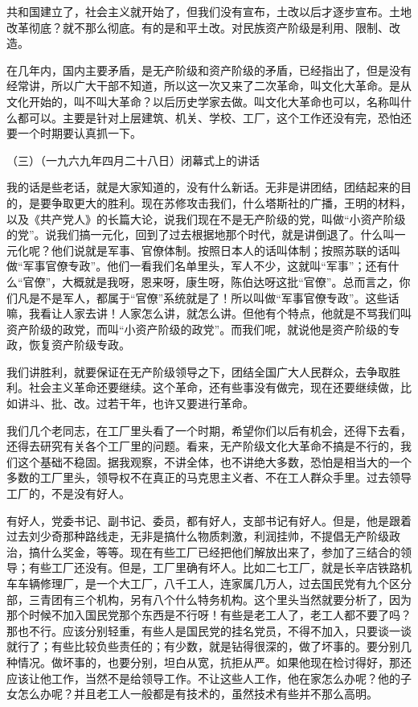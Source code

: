 共和国建立了，社会主义就开始了，但我们没有宣布，土改以后才逐步宣布。土地改革彻底？就不那么彻底。有的是和平土改。对民族资产阶级是利用、限制、改造。

在几年内，国内主要矛盾，是无产阶级和资产阶级的矛盾，已经指出了，但是没有经常讲，所以广大干部不知道，所以这一次又来了二次革命，叫文化大革命。是从文化开始的，叫不叫大革命？以后历史学家去做。叫文化大革命也可以，名称叫什么都可以。主要是针对上层建筑、机关、学校、工厂，这个工作还没有完，恐怕还要一个时期要认真抓一下。

（三）（一九六九年四月二十八日）闭幕式上的讲话

我的话是些老话，就是大家知道的，没有什么新话。无非是讲团结，团结起来的目的，是要争取更大的胜利。现在苏修攻击我们，什么塔斯社的广播，王明的材料，以及《共产党人》的长篇大论，说我们现在不是无产阶级的党，叫做“小资产阶级的党”。说我们搞一元化，回到了过去根据地那个时代，就是讲倒退了。什么叫一元化呢？他们说就是军事、官僚体制。按照日本人的话叫体制；按照苏联的话叫做“军事官僚专政”。他们一看我们名单里头，军人不少，这就叫“军事”；还有什么“官僚”，大概就是我呀，恩来呀，康生呀，陈伯达呀这批“官僚”。总而言之，你们凡是不是军人，都属于“官僚”系统就是了！所以叫做“军事官僚专政”。这些话嘛，我看让人家去讲！人家怎么讲，就怎么讲。但他有个特点，他就是不骂我们叫资产阶级的政党，而叫“小资产阶级的政党”。而我们呢，就说他是资产阶级的专政，恢复资产阶级专政。

我们讲胜利，就要保证在无产阶级领导之下，团结全国广大人民群众，去争取胜利。社会主义革命还要继续。这个革命，还有些事没有做完，现在还要继续做，比如讲斗、批、改。过若干年，也许又要进行革命。

我们几个老同志，在工厂里头看了一个时期，希望你们以后有机会，还得下去看，还得去研究有关各个工厂里的问题。看来，无产阶级文化大革命不搞是不行的，我们这个基础不稳固。据我观察，不讲全体，也不讲绝大多数，恐怕是相当大的一个多数的工厂里头，领导权不在真正的马克思主义者、不在工人群众手里。过去领导工厂的，不是没有好人。

有好人，党委书记、副书记、委员，都有好人，支部书记有好人。但是，他是跟着过去刘少奇那种路线走，无非是搞什么物质刺激，利润挂帅，不提倡无产阶级政治，搞什么奖金，等等。现在有些工厂已经把他们解放出来了，参加了三结合的领导；有些工厂还没有。但是，工厂里确有坏人。比如二七工厂，就是长辛店铁路机车车辆修理厂，是一个大工厂，八千工人，连家属几万人，过去国民党有九个区分部，三青团有三个机构，另有八个什么特务机构。这个里头当然就要分析了，因为那个时候不加入国民党那个东西是不行呀！有些是老工人了，老工人都不要了吗？那也不行。应该分别轻重，有些人是国民党的挂名党员，不得不加入，只要谈一谈就行了；有些比较负些责任的；有少数，就是钻得很深的，做了坏事的。要分别几种情况。做坏事的，也要分别，坦白从宽，抗拒从严。如果他现在检讨得好，那还应该让他工作，当然不是给领导工作。不让这些人工作，他在家怎么办呢？他的子女怎么办呢？并且老工人一般都是有技术的，虽然技术有些并不那么高明。

